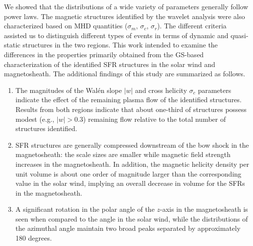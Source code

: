We showed that the distributions of a wide variety of parameters generally follow power laws. The magnetic structures identified by the wavelet analysis were also characterized based on MHD quantities ($\sigma_m$, $\sigma_c$, $\sigma_r$). The different criteria assisted us to distinguish different types of events in terms of dynamic and quasi-static structures in the two regions. This work intended to examine the differences in the properties primarily obtained from the GS-based characterization of the identified SFR structures in the solar wind and magnetosheath. The additional findings of this study are summarized as follows.
\begin{enumerate}
    \item The magnitudes of the Wal\'en slope $|w|$ and cross helicity $\sigma_c$ parameters indicate the effect of the remaining plasma flow of the identified structures. Results from both regions indicate that about one-third of structures possess modest (e.g., $|w|>0.3$) remaining flow relative to the total number of structures identified.
    \item SFR structures are generally compressed downstream of the bow shock in the magnetosheath: the scale sizes are smaller while magnetic field strength increases in the magnetosheath. In addition, the magnetic helicity density per unit volume is about one order of magnitude larger than the corresponding value in the solar wind, implying an overall decrease in volume for the SFRs in the magnetosheath.
    \item A significant rotation in the polar angle of the $z$-axis in the magnetosheath is seen when compared to the angle in the solar wind, while the distributions of the azimuthal angle maintain two broad peaks separated by approximately 180 degrees. 
\end{enumerate}